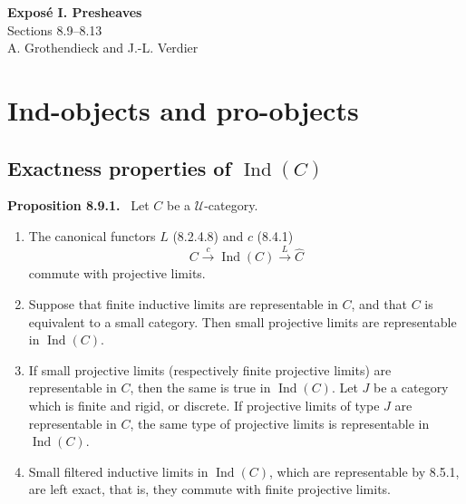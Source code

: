 \documentclass[11pt]{article}
\newcommand{\U}{\mathcal{U}}
\newcommand{\Ind}{\operatorname{Ind}}
\newenvironment{statement}[1]{\par\medskip\noindent\textbf{#1.}\ }{\par\medskip}
\begin{document}
\begin{center}
{\Large \textbf{Expos\'e I. Presheaves}}\\[0.35em]
{\large Sections 8.9--8.13}\\[0.35em]
A. Grothendieck and J.-L. Verdier
\end{center}

\bigskip


\setcounter{section}{7}
\section{Ind-objects and pro-objects}

\setcounter{subsection}{8}
\subsection{Exactness properties of \texorpdfstring{$\Ind(C)$}{Ind(C)}}

\begin{statement}{Proposition 8.9.1}
Let $C$ be a $\U$-category.
\begin{enumerate}[label=\alph*)]
\item The canonical functors $L$ (8.2.4.8) and $c$ (8.4.1)
\[
 C\xrightarrow{c}\Ind(C)\xrightarrow{L}\widehat C
\]
commute with projective limits.

\item Suppose that finite inductive limits are representable in $C$, and that $C$ is equivalent to a small category. Then small projective limits are representable in $\Ind(C)$.

\item If small projective limits (respectively finite projective limits) are representable in $C$, then the same is true in $\Ind(C)$. Let $J$ be a category which is finite and rigid, or discrete. If projective limits of type $J$ are representable in $C$, the same type of projective limits is representable in $\Ind(C)$.

\item Small filtered inductive limits in $\Ind(C)$, which are representable by 8.5.1, are left exact, that is, they commute with finite projective limits.
\end{enumerate}
\end{statement}
\end{document}
